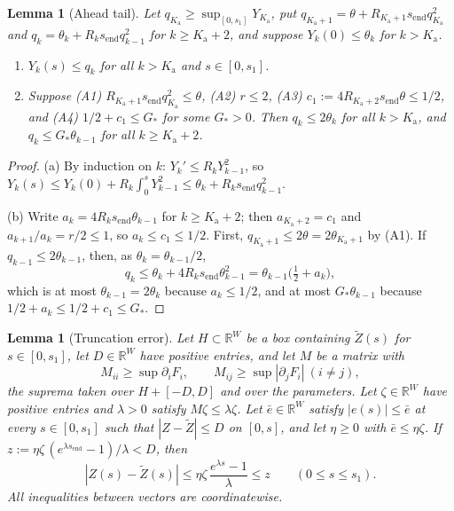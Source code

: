 \documentclass[12pt,reqno]{amsart}
\numberwithin{equation}{section}
\theoremstyle{plain}
\newtheorem{lemma}[theorem]{Lemma}
\theoremstyle{definition}
\theoremstyle{remark}
\newcommand{\Ka}{K_{\mathrm a}}
\newcommand{\send}{s_{\mathrm{end}}}
\newcommand{\R}{\mathbb{R}}
\begin{document}
\begin{lemma}[Ahead tail]\label{lem:ahead}
Let $q_{\Ka}\ge\sup_{[0,s_1]}Y_{\Ka}$, put $q_{\Ka+1}=\theta+R_{\Ka+1}\send q_{\Ka}^2$ and
$q_k=\theta_k+R_k\send q_{k-1}^2$ for $k\ge\Ka+2$, and suppose $Y_k(0)\le\theta_k$ for
$k>\Ka$.
\begin{enumerate}[label=\textup{(\alph*)}]
\item $Y_k(s)\le q_k$ for all $k>\Ka$ and $s\in[0,s_1]$.
\item Suppose \textup{(A1)} $R_{\Ka+1}\send q_{\Ka}^2\le\theta$, \textup{(A2)} $r\le2$,
\textup{(A3)} $c_1:=4R_{\Ka+2}\send\theta\le1/2$, and \textup{(A4)} $1/2+c_1\le G_*$
for some $G_*>0$. Then $q_k\le2\theta_k$ for all $k>\Ka$, and
$q_k\le G_*\theta_{k-1}$ for all $k\ge\Ka+2$.
\end{enumerate}
\end{lemma}

\begin{proof}
(a) By induction on $k$: $Y_k'\le R_kY_{k-1}^2$, so
$Y_k(s)\le Y_k(0)+R_k\int_0^sY_{k-1}^2\le\theta_k+R_k\send q_{k-1}^2$.

(b) Write $a_k=4R_k\send\theta_{k-1}$ for $k\ge\Ka+2$; then $a_{\Ka+2}=c_1$ and
$a_{k+1}/a_k=r/2\le1$, so $a_k\le c_1\le1/2$. First,
$q_{\Ka+1}\le2\theta=2\theta_{\Ka+1}$ by (A1). If $q_{k-1}\le2\theta_{k-1}$, then, as
$\theta_k=\theta_{k-1}/2$,
\[
  q_k\le\theta_k+4R_k\send\theta_{k-1}^2=\theta_{k-1}\bigl(\tfrac12+a_k\bigr),
\]
which is at most $\theta_{k-1}=2\theta_k$ because $a_k\le1/2$, and at most
$G_*\theta_{k-1}$ because $1/2+a_k\le1/2+c_1\le G_*$.
\end{proof}

\begin{lemma}[Truncation error]\label{lem:comparison}
Let $H\subset\R^W$ be a box containing $\tilde Z(s)$ for $s\in[0,s_1]$, let
$D\in\R^W$ have positive entries, and let $M$ be a matrix with
\[
  M_{ii}\ge\sup\partial_iF_i,\qquad M_{ij}\ge\sup|\partial_jF_i|\ (i\ne j),
\]
the suprema taken over $H+[-D,D]$ and over the parameters. Let $\zeta\in\R^W$
have positive entries and $\lambda>0$ satisfy $M\zeta\le\lambda\zeta$. Let $\bar e\in\R^W$
satisfy $|e(s)|\le\bar e$ at every $s\in[0,s_1]$ such that $|Z-\tilde Z|\le D$ on
$[0,s]$, and let $\eta\ge0$ with $\bar e\le\eta\zeta$. If
$z:=\eta\zeta\,(e^{\lambda\send}-1)/\lambda<D$, then
\[
  |Z(s)-\tilde Z(s)|\le\eta\zeta\,\frac{e^{\lambda s}-1}{\lambda}\le z\qquad(0\le s\le s_1).
\]
All inequalities between vectors are coordinatewise.
\end{lemma}
\end{document}
